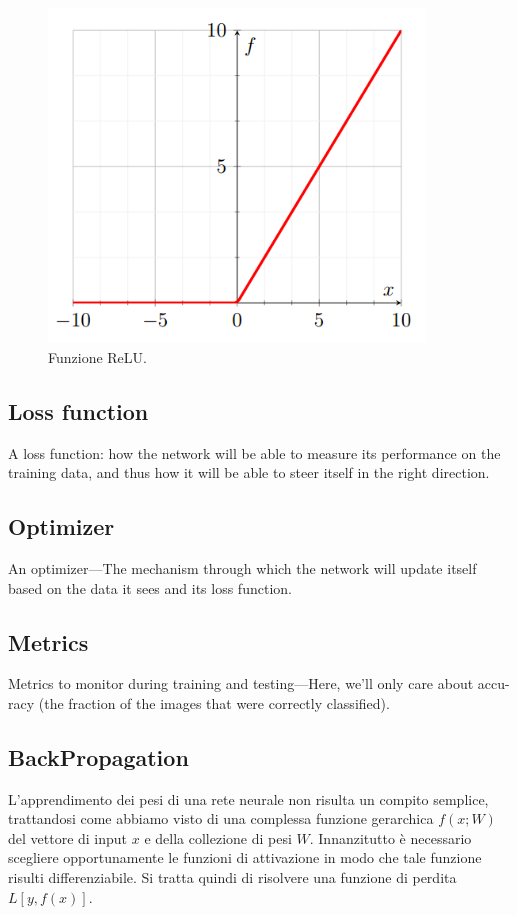 \begin{figure}[htb]
	\centering
	\includegraphics[width = 100mm]{images/relu.png}
	\caption{Funzione ReLU.}
	\label{img:relu}
\end{figure}

\subsection{Loss function}
A loss function: how the network will be able to measure its performance on the training data, and thus how it will be able to steer itself in the right direction.
\subsection{Optimizer}
An optimizer—The mechanism through which the network will update itself based on the data it sees and its loss function.
\subsection{Metrics}
Metrics to monitor during training and testing—Here, we’ll only care about accu- racy (the fraction of the images that were correctly classified).



\subsection{BackPropagation}
\label{backprop}
L'apprendimento dei pesi di una rete neurale non risulta un compito semplice, trattandosi come abbiamo visto di una complessa funzione gerarchica $f(x;W)$ del vettore di input $x$ e della collezione di pesi $W$.  Innanzitutto è necessario scegliere opportunamente le funzioni di attivazione in modo che tale funzione risulti differenziabile. Si tratta quindi di risolvere una funzione di perdita $L[y, f(x)]$.

